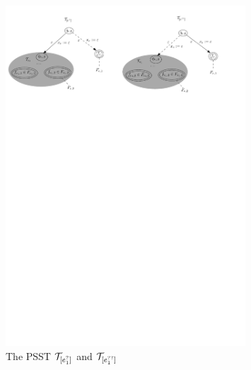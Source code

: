 %
		\begin{figure}[htbp]
			\centering
			\includegraphics[width = 0.8\textwidth]{reg2pfa-6.pdf}
			\caption{The PSST $\mathcal{T}_{[e_1^?]}$ and $\mathcal{T}_{[e_1^{??}]}$}
			\label{fig-reg2pfa-6}
		\end{figure}

